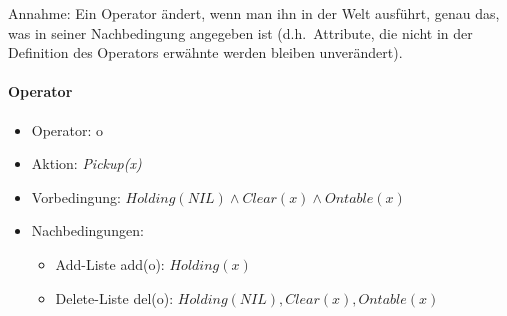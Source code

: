Annahme: Ein Operator ändert, wenn man ihn in der Welt ausführt, genau das, was in seiner Nachbedingung angegeben ist (d.h.\ Attribute, die nicht in der Definition des Operators erwähnte werden bleiben unverändert).

\paragraph{Operator}
\begin{itemize}
	\item Operator: o
	\item Aktion: \emph{Pickup(x)}
	\item Vorbedingung: $Holding(NIL) \wedge Clear(x) \wedge Ontable(x)$
	\item Nachbedingungen:
	\begin{itemize}
		\item Add-Liste add(o): $Holding(x)$
		\item Delete-Liste del(o): $Holding(NIL), Clear(x), Ontable(x)$
	\end{itemize}
\end{itemize}

